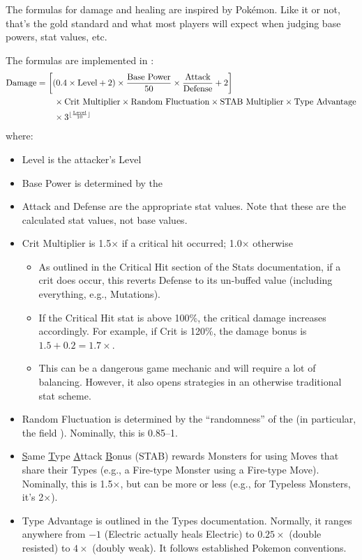 

The formulas for damage and healing are inspired by Pok\'{e}mon. Like it or not, that's the gold standard and what most players will expect when judging base powers, stat values, etc.

The formulas are implemented in :
\begin{align*}
	\text{Damage} &= \left[\left(0.4\times \text{Level} + 2\right) \times \frac{\text{Base Power}}{50} \times \frac{\text{Attack}}{\text{Defense}} + 2\right]\\
		& \qquad \times \text{Crit Multiplier} \times \text{Random Fluctuation} \times \text{STAB Multiplier} \times \text{Type Advantage}\\
		& \qquad \times 3^{\lfloor\frac{\text{Level}}{10}\rfloor}
\end{align*}
where:
\begin{itemize}
	\item{Level is the attacker's Level}
	\item{Base Power is determined by the }
	\item{Attack and Defense are the appropriate stat values. Note that these are the calculated stat values, not base values.}
	\item{Crit Multiplier is 1.5$\times$ if a critical hit occurred; 1.0$\times$ otherwise
		\begin{itemize}
			\item{As outlined in the Critical Hit section of the Stats documentation, if a crit does occur, this reverts Defense to its un-buffed value (including everything, e.g., Mutations).}
			\item{If the Critical Hit stat is above 100\%, the critical damage increases accordingly. For example, if Crit is 120\%, the damage bonus is $1.5 + 0.2 = 1.7\times$.}
			\item{This can be a dangerous game mechanic and will require a lot of balancing. However, it also opens strategies in an otherwise traditional stat scheme.}
		\end{itemize}
	}
	\item{Random Fluctuation is determined by the ``randomness'' of the  (in particular, the field ). Nominally, this is 0.85--1.}
	\item{\ul{S}ame \ul{T}ype \ul{A}ttack \ul{B}onus (STAB) rewards Monsters for using Moves that share their Types (e.g., a Fire-type Monster using a Fire-type Move). Nominally, this is 1.5$\times$, but can be more or less (e.g., for Typeless Monsters, it's 2$\times$).}
	\item{Type Advantage is outlined in the Types documentation. Normally, it ranges anywhere from $-1$ (Electric actually heals Electric) to $0.25\times$ (double resisted) to $4\times$ (doubly weak). It follows established Pokemon conventions.}
\end{itemize}
